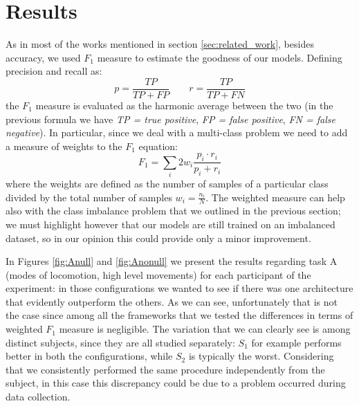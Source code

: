 
\section{Results}
\label{sec:results}

As in most of the works mentioned in section \ref{sec:related_work}, besides accuracy, we used $F_1$ measure to estimate the goodness of our models. Defining precision and recall as: 
\begin{equation}
	p = \frac{TP}{TP+FP} \qquad r = \frac{TP}{TP+FN}
\end{equation}
the $F_1$ measure is evaluated as the harmonic average between the two (in the previous formula we have \textit{TP = true positive}, \textit{FP = false positive}, \textit{FN = false negative}). In particular, since we deal with a multi-class problem we need to add a measure of weights to the $F_1$ equation:
\begin{equation}
	F_1 = \sum_i 2w_i \frac{p_i \cdot r_i}{p_i + r_i}
\end{equation} 
where the weights are defined as the number of samples of a particular class divided by the total number of samples $w_i = \frac{n_i}{N}$. The weighted measure can help also with the class imbalance problem that we outlined in the previous section; we must highlight however that our models are still trained on an imbalanced dataset, so in our opinion this could provide only a minor improvement.

In Figures \ref{fig:Anull} and \ref{fig:Anonull} we present the results regarding task A (modes of locomotion, high level movements) for each participant of the experiment: in those configurations we wanted to see if there was one architecture that evidently outperform the others. As we can see, unfortunately that is not the case since among all the frameworks that we tested the differences in terms of weighted $F_1$ measure is negligible. The variation that we can clearly see is among distinct subjects, since they are all studied separately: $S_1$ for example performs better in both the configurations, while $S_2$ is typically the worst. Considering that we consistently performed the same procedure independently from the subject, in this case this discrepancy could be due to a problem occurred during data collection. 

